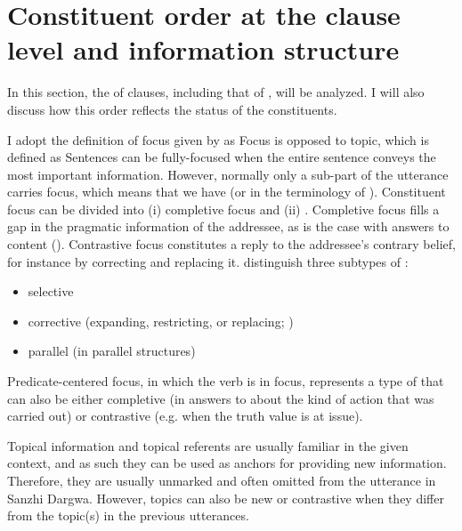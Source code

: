 \section{Constituent order at the clause level and information structure}
\label{sec:Constituent order at the clause level and information structure}

In this section, the  of clauses, including that of , will be analyzed. I will also discuss how this order reflects the  status of the constituents.

I adopt the definition of focus given by \citet{Diketal1981} as  Focus is opposed to topic, which is defined as  Sentences can be fully-focused when the entire sentence conveys the most important information. However, normally only a sub-part of the utterance carries focus, which means that we have  (or  in the terminology of \citealp{Diketal1981}). Constituent focus can be divided into (i) completive focus and (ii) . Completive focus fills a gap in the pragmatic information of the addressee, as is the case with answers to content  (). Contrastive focus constitutes a reply to the addressee's contrary belief, for instance by correcting and replacing it.  distinguish three subtypes of :
%
\begin{itemize}
	\item	selective
	\item	corrective (expanding, restricting, or replacing; )
	\item	parallel (in parallel structures)
\end{itemize}

Predicate-centered focus, in which the verb is in focus, represents a type of  that can also be either completive (in answers to  about the kind of action that was carried out) or contrastive (e.g. when the truth value is at issue).

Topical information and topical referents are usually familiar in the given context, and as such they can be used as anchors for providing new information. Therefore, they are usually unmarked and often omitted from the utterance in Sanzhi Dargwa. However, topics can also be new or contrastive when they differ from the topic(s) in the previous utterances.

